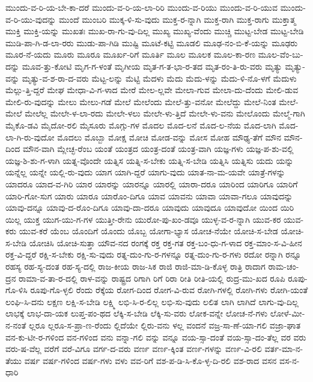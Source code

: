 {ಮುಂದು-ವ-ರಿ-ಯ-ಬೇ-ಕಾ-ದರೆ
ಮುಂದು-ವ-ರಿ-ಯ-ಲಾ-ರಿರಿ
ಮುಂದು-ವ-ರಿಯು
ಮುಂದು-ವ-ರಿ-ಯುವ
ಮುಂದು-ವ-ರಿ-ಯು-ವುದನ್ನು
ಮುಂದೆ
ಮುಂಬರಿ
ಮುಕ್ಕ-ಳಿ-ಸು-ವುದು
ಮುಕ್ತ-ರ-ನ್ನಾಗಿ
ಮುಕ್ತ-ರಾಗಿ
ಮುಕ್ತ-ರಾಗು
ಮುಕ್ತಾತ್ಮ
ಮುಕ್ತಿ
ಮುಕ್ತಿ-ಯನ್ನು
ಮುಖತಃ
ಮುಖ-ರಾ-ಗು-ವು-ದಿಲ್ಲ
ಮುಖ್ಯ
ಮುಖ್ಯ-ವೆಂದು
ಮುಚ್ಚಿ
ಮುಟ್ಟ-ಬೇಡ
ಮುಟ್ಟ-ಬೇಡಿ
ಮುಡಿ-ಪಾ-ಗಿ-ಡ-ಲಾ-ರರು
ಮುಡು-ಪಾ-ಗಿಡಿ
ಮುಷ್ಟಿ
ಮೂಟೆ-ಕಟ್ಟಿ
ಮೂಡಲಿ
ಮೂಢ-ನಂ-ಬಿ-ಕೆ-ಯನ್ನು
ಮೂಢರು
ಮೂರ-ನೆ-ಯದು
ಮೂರು
ಮೂರೂ
ಮೂರ್ಖ-ರಿಗೆ
ಮೂರ್ತಿ
ಮೂಲ
ಮೂಲಕ
ಮೂಲ-ಕಾ-ರಣ
ಮೂಲ-ವೆಂ-ಬು-ದನ್ನು
ಮೂವ-ತ್ತು-ಕೋಟಿ
ಮೃಗ-ಗ-ಳಂತೆ
ಮೃಗೀಯ
ಮೃತ-ಗ-ತ-ಭಾ-ರ-ತದ
ಮೃತ-ರಂ-ತಿ-ರು-ವರು
ಮೃತ್ಯು
ಮೃತ್ಯು-ವನ್ನು
ಮೃತ್ಯು-ವ-ಶ-ರಾ-ದ-ವರು
ಮೆಟ್ಟ-ಲನ್ನು
ಮೆಟ್ಟಿ
ಮೆದಳು
ಮೆದು
ಮೆದು-ಳನ್ನು
ಮೆದು-ಳಿ-ನೊ-ಳಗೆ
ಮೆದುಳು
ಮೆಲ್ಲು-ತ್ತಿ-ದ್ದರೆ
ಮೇಘ
ಮೇಧಾ-ವಿ-ಗ-ಳಾದ
ಮೇರೆ
ಮೇಲ-ಲ್ಲವೇ
ಮೇಲಾ-ಗುವ
ಮೇಲಾ-ದು-ದೆಂದು
ಮೇಲಿ-ಡುವ
ಮೇಲಿ-ರು-ವುದನ್ನು
ಮೇಲು
ಮೇಲು-ಗಡೆ
ಮೇಲೆ
ಮೇಲೆಂದು
ಮೇಲೆ-ತ್ತು-ವನೋ
ಮೇಲೆದ್ದು
ಮೇಲೆ-ನಿಂತ
ಮೇಲೆ-ಮೇಲೆ
ಮೇಲೆಲ್ಲ
ಮೇಲೇ-ಳ-ಲಾ-ರದು
ಮೇಲೇ-ಳಲು
ಮೇಲೇ-ಳು-ತ್ತಿದೆ
ಮೇಲೇ-ಳು-ವನು
ಮೇಲೊಂದು
ಮೇಲ್ಮೆ-ಗಾಗಿ
ಮೈಕೊ-ಡವಿ
ಮೈದೋ-ರಲಿ
ಮೈಸೂರು
ಮೊಗ್ಗು-ಗಳ
ಮೊದಲ
ಮೊದ-ಲನೆ
ಮೊದ-ಲ-ನೆಯ
ಮೊದ-ಲಾಗಿ
ಮೊದ-ಲಾ-ಗಿ-ರು-ವುದೋ
ಮೊದಲು
ಮೊಬ್ಬಾ
ಮೋಕ್ಷ
ಮೋಚಿ
ಮೋಡ-ವನ್ನು
ಮೋಸ
ಮೋಹ
ಮೌಢ್ಯ-ತೆಗೆ
ಮೌನ
ಮೌನ-ದಿಂದ
ಮೌನ-ವಾಗಿ
ಮ್ಲೇಚ್ಛ-ರೆಂಬ
ಯಂತೆ
ಯಂತ್ರದ
ಯಂತ್ರ-ದಂತೆ
ಯಂತ್ರ-ವಾಗಿ
ಯಜ್ಞ-ಗಳು
ಯಜ್ಞ-ಪ-ಶು-ವಲ್ಲಿ
ಯಜ್ಞ-ಶಿ-ಶು-ಗ-ಳಾಗಿ
ಯತ್ನ-ವೊಂದೇ
ಯತ್ನಿಸ
ಯತ್ನಿ-ಸ-ಬೇಕು
ಯತ್ನಿ-ಸ-ಬೇಡಿ
ಯತ್ನಿಸಿ
ಯತ್ನಿಸು
ಯದು
ಯನ್ನು
ಯನ್ನೆಲ್ಲ
ಯನ್ನೇ
ಯಲ್ಲಿ-ರು-ವುದು
ಯಾಗ
ಯಾಗಿ-ದ್ದರೆ
ಯಾಗು-ವುದು
ಯಾತ-ನಾ-ಮ-ಯವೇ
ಯಾತ್ರೆ-ಗಳನ್ನು
ಯಾದರೂ
ಯಾದ-ವ-ಗಿರಿ
ಯಾರ
ಯಾರನ್ನು
ಯಾರನ್ನೂ
ಯಾರಲ್ಲಿ
ಯಾರಾ-ದರೂ
ಯಾರಿಂದ
ಯಾರಿಗೂ
ಯಾರಿಗೆ
ಯಾರಿ-ಗೋ-ಸುಗ
ಯಾರು
ಯಾರೂ
ಯಾರೊಂ-ದಿಗೂ
ಯಾವ
ಯಾವನು
ಯಾವಾ
ಯಾವಾ-ಗಲೂ
ಯಾವುದನ್ನು
ಯಾವು-ದನ್ನೂ
ಯಾವು-ದ-ರೊಂ-ದಿಗೂ
ಯಾವು-ದಾ-ದರೂ
ಯಾವುದು
ಯಾವುದೂ
ಯಾವುದೋ
ಯಿಂದ
ಯಿರಿ
ಯಿಲ್ಲ
ಯುಕ್ತ
ಯುಗ-ಯು-ಗ-ಗಳ
ಯುತ್ತೀ-ರೇನು
ಯುರೋ-ಪು-ಖಂ-ಡವೂ
ಯುಳ್ಳ-ವ-ರ-ನ್ನಾಗಿ
ಯುವ-ಕರ
ಯುವ-ಕರು
ಯುವ-ಕರೆ
ಯೆಂಬ
ಯೊಂದಿಗೆ
ಯೊಂದು
ಯೊಬ್ಬ
ಯೋಗಾ-ಭ್ಯಾಸ
ಯೋಚ-ನೆಯೇ
ಯೋಚಿ-ಸ-ಬೇಡ
ಯೋಚಿ-ಸ-ಬೇಡಿ
ಯೋಚಿಸಿ
ಯೋಚಿ-ಸುತ್ತಾ
ಯೌವ-ನದ
ರಂಗಕ್ಕೆ
ರಕ್ತ
ರಕ್ತ-ಗತ
ರಕ್ತ-ಬಂ-ಧು-ಗ-ಳಾದ
ರಕ್ತ-ಮಾಂ-ಸ-ವಿ-ಹೀನ
ರಕ್ತ-ವಿ-ದ್ದರೆ
ರಕ್ಷಿ-ಸ-ಬೇಕು
ರಕ್ಷಿ-ಸು-ವುದು
ರತ್ನ-ದುಂ-ಗು-ರ-ಗಳನ್ನೂ
ರತ್ನ-ದುಂ-ಗು-ರ-ಗಳು
ರದೋ
ರನ್ನಾಗಿ
ರನ್ನೂ
ರಹಸ್ಯ
ರಹ-ಸ್ಯ-ದಂತ
ರಹ-ಸ್ಯ-ದಲ್ಲಿ
ರಾಜ-ಕೀಯ
ರಾಜ-ಸಿಕ
ರಾಜಿ
ರಾಜಿ-ಮಾ-ಡಿ-ಕೊಳ್ಳ
ರಾತ್ರಿ
ರಾದಾಗ
ರಾಮ-ಚಂ-ದ್ರನ
ರಾಮಾ-ವ-ತಾ-ರ-ದಲ್ಲಿ
ರಾಳ-ವನ್ನು
ರಾಷ್ಟ್ರದ
ರಿಗಾಗಿ
ರಿಗೆ
ರಿರಾ
ರೀತಿ
ರೀತಿ-ಯಲ್ಲಿ
ರುದ್ರ-ಮು-ಖದ
ರೂಪಿ
ರೂಪು-ಗೊ-ಳಿಸಿ
ರೂಪು-ಗೊ-ಳ್ಳಲಿ
ರೆಂದು
ರೆಕ್ಕೆಯ
ರೋಗ-ದಿಂದ
ರೋಗ-ವಿ-ರುವ
ರೋಗಿ-ಗಳಲ್ಲಿ
ರೋಗಿ-ಗಳು
ರೋಗಿ-ಯಂತೆ
ಲಂಘಿ-ಸಿ-ದನು
ಲಕ್ಷಣ
ಲಕ್ಷಿ-ಸ-ಬೇಡಿ
ಲಕ್ಷ್ಮಿ
ಲಭಿ-ಸಿ-ರ-ಲಿಲ್ಲ
ಲಭಿ-ಸು-ವುದು
ಲಲಿತ
ಲಾಗಿ
ಲಾಗಿದೆ
ಲಾಗು-ವು-ದಿಲ್ಲ
ಲಾಭಕ್ಕೆ
ಲಾಭ-ದಾ-ಯಕ
ಲುಪ್ತ-ಪಂ-ಥದ
ಲೆಕ್ಕಿ-ಸ-ಬೇಡಿ
ಲೆಕ್ಕಿ-ಸು-ವರು
ಲೋಕ-ವನ್ನೇ
ಲೋಚ-ನೆ-ಗಳು
ಲೋಳೆ-ಮೀ-ನ-ನಂತೆ
ಲ್ಲರೂ
ಲ್ಲರೂ-ಸ-ಪ್ರಾ-ಣ-ರೆಂದು
ಲ್ಲಿದೆಯೇ
ಲ್ಲಿರು-ವನು
ಳಲ್ಲ
ವಂದನೆ
ವಜ್ರ-ಸಾ-ಣೆ-ಯಾ-ಗಲಿ
ವಜ್ರಾ-ಘಾತ
ವನ-ಕು-ಟೀ-ರ-ಗಳಿಂದ
ವನ-ಗಳಿಂದ
ವನು
ವನ್ನಾ-ಗಲಿ
ವನ್ನು
ವನ್ನೂ
ವಯ-ಸ್ಸಾ-ದಂತೆ
ವಯ-ಸ್ಸಾ-ದಂ-ತೆಲ್ಲ
ವರ
ವರು
ವರು-ಷ-ವೆಲ್ಲ
ವರೆಗೆ
ವರೆ-ವಿಗೂ
ವರ್ಗ-ದ-ವರು
ವರ್ಣ
ವರ್ಣ-ಕ್ಕಿಂತ
ವರ್ಣ-ಗಳನ್ನು
ವರ್ಣ-ವಿ-ರಲಿ
ವರ್ತ-ಮಾ-ನ-ತೆಯು
ವರ್ಷ
ವರ್ಷ-ಗಳಿಂದ
ವರ್ಷ-ಗಳು
ವಳು
ವವ-ರಿಗೆ
ವಶ-ಪ-ಡಿ-ಸಿ-ಕೊ-ಳ್ಳ-ದಿ-ರಲಿ
ವಶ-ರಾದ
ವಸನ
ವಸ-ನ-ಧಾರಿ
}
